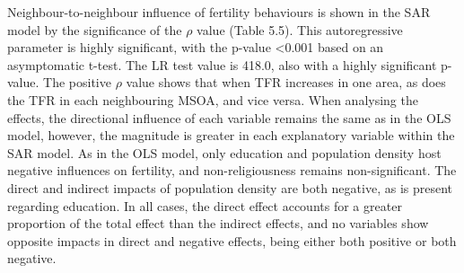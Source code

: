 \documentclass[12pt,twoside]{reedthesis}
\begin{document}
Neighbour-to-neighbour influence of fertility behaviours is shown in the SAR model by the significance of the \(\rho\) value (Table 5.5). This autoregressive parameter is highly significant, with the p-value \textless0.001 based on an asymptomatic t-test. The LR test value is 418.0, also with a highly significant p-value. The positive \(\rho\) value shows that when TFR increases in one area, as does the TFR in each neighbouring MSOA, and vice versa. When analysing the effects, the directional influence of each variable remains the same as in the OLS model, however, the magnitude is greater in each explanatory variable within the SAR model. As in the OLS model, only education and population density host negative influences on fertility, and non-religiousness remains non-significant. The direct and indirect impacts of population density are both negative, as is present regarding education. In all cases, the direct effect accounts for a greater proportion of the total effect than the indirect effects, and no variables show opposite impacts in direct and negative effects, being either both positive or both negative.
\end{document}
